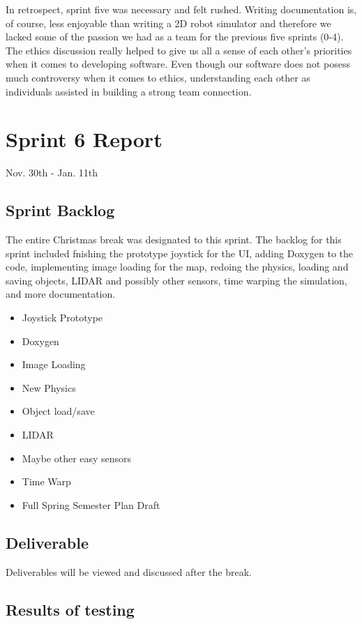 In retrospect, sprint five was necessary and felt rushed. Writing documentation is, of course, less enjoyable than writing a 2D robot simulator and therefore we lacked some of the passion we had as a team for the previous five sprints (0-4). The ethics discussion really helped to give us all a sense of each other's priorities when it comes to developing software. Even though our software does not posess much controversy when it comes to ethics, understanding each other as individuals assisted in building a strong team connection.


\section{Sprint 6 Report}
Nov. 30th - Jan. 11th
\subsection{Sprint Backlog}

The entire Christmas break was designated to this sprint. The backlog for this sprint included fnishing the prototype joystick for the UI, adding Doxygen to the code, implementing image loading for the map, redoing the physics, loading and saving objects, LIDAR and possibly other sensors, time warping the simulation, and more documentation.

\begin{itemize}
	\item Joystick Prototype
	\item Doxygen	
	\item Image Loading
	\item New Physics
	\item Object load/save
	\item LIDAR
	\item Maybe other easy sensors
	\item Time Warp
	\item Full Spring Semester Plan Draft
\end{itemize}

\subsection{Deliverable}

Deliverables will be viewed and discussed after the break.

\subsection{Results of testing}


